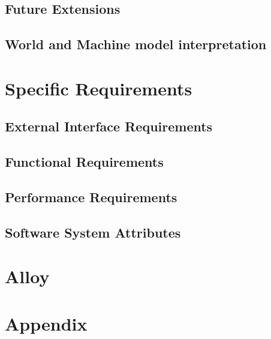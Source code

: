 \documentclass[a4paper,12pt]{report}
\begin{document}
	\section{Future Extensions}

	\section{World and Machine model interpretation}

	\chapter{Specific Requirements}
	\label{ch:Specific_Requirements}

	\section{External Interface Requirements}

	\section{Functional Requirements} 

	\section{Performance Requirements} 

	\section{Software System Attributes} 

	\chapter{Alloy} 
	\label{ch: alloy}

	\appendix
	\chapter{Appendix}
\end{document}
